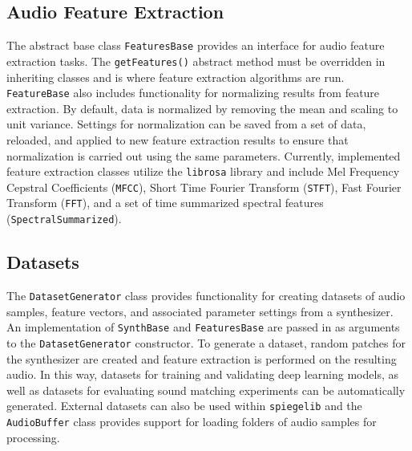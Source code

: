 \subsection{Audio Feature Extraction}
The abstract base class \texttt{FeaturesBase} provides an interface for audio feature extraction tasks. 
The \texttt{getFeatures()} abstract method must be overridden in inheriting classes and is where feature extraction algorithms are run.  \texttt{FeatureBase} also includes functionality for normalizing results from feature extraction. By default, data is normalized by removing the mean and scaling to unit variance. Settings for normalization can be saved from a set of data, reloaded, and applied to new feature extraction results to ensure that normalization is carried out using the same parameters. Currently, implemented feature extraction classes utilize the \texttt{librosa} library \cite{mcfee2015librosa} and include Mel Frequency Cepstral Coefficients (\texttt{MFCC}), Short Time Fourier Transform (\texttt{STFT}), Fast Fourier Transform (\texttt{FFT}), and a set of time summarized spectral features (\texttt{SpectralSummarized}).

\subsection{Datasets}
The \texttt{DatasetGenerator} class provides functionality for creating datasets of audio samples, feature vectors, and associated parameter settings from a synthesizer. An implementation of \texttt{SynthBase} and \texttt{FeaturesBase} are passed in as arguments to the \texttt{DatasetGenerator} constructor. To generate a dataset, random patches for the synthesizer are created and feature extraction is performed on the resulting audio. In this way, datasets for training and validating deep learning models, as well as datasets for evaluating sound matching experiments can be automatically generated. 
External datasets can also be used within \texttt{spiegelib} and the \texttt{AudioBuffer} class provides support for loading folders of audio samples for processing.

